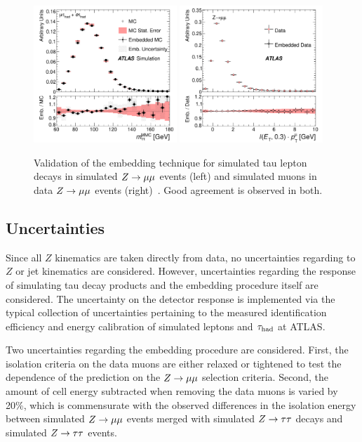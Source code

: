 \begin{figure}[tp]
  \centering
  \includegraphics[width=0.48\textwidth]{figures/HIGG-2013-32/fig_03b}
  \includegraphics[width=0.48\textwidth]{figures/HIGG-2013-32/fig_03a}
  \caption{Validation of the embedding technique for simulated tau lepton decays in simulated $Z \rightarrow \mu\mu$ events (left) and simulated muons in data $Z \rightarrow \mu\mu$ events (right)~\cite{HIGG-2013-32}. Good agreement is observed in both.}
  \label{fig:backgrounds-embedding-validation}
\end{figure}

\clearpage

\subsection{Uncertainties}

Since all $Z$ kinematics are taken directly from data, no uncertainties regarding to $Z$ or jet kinematics are considered. However, uncertainties regarding the response of simulating tau decay products and the embedding procedure itself are considered. The uncertainty on the detector response is implemented via the typical collection of uncertainties pertaining to the measured identification efficiency and energy calibration of simulated leptons and $\tau_\text{had}$ at ATLAS.

Two uncertainties regarding the embedding procedure are considered. First, the isolation criteria on the data muons are either relaxed or tightened to test the dependence of the prediction on the $Z \rightarrow \mu\mu$ selection criteria. Second, the amount of cell energy subtracted when removing the data muons is varied by 20\%, which is commensurate with the observed differences in the isolation energy between simulated $Z \rightarrow \mu\mu$ events merged with simulated $Z\rightarrow\tau\tau$ decays and simulated $Z\rightarrow\tau\tau$ events.

